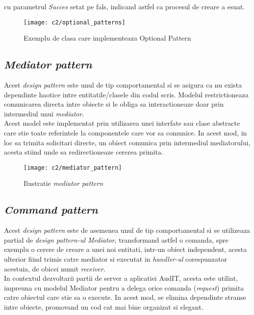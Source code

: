  cu parametrul \textit{Succes} setat pe fals, indicand astfel ca procesul de creare a esuat.\\

\begin{figure}[h]
	\centering
	
	\texttt{[image: c2/optional\_patterns]}
	\caption{Exemplu de clasa care implementeaza Optional Pattern}
\end{figure}

\subsection*{\textit{Mediator pattern}}
Acest \textit{design pattern} este unul de tip comportamental si se asigura ca nu exista dependinte haotice intre entitatile/clasele din codul scris. Modelul restrictioneaza comunicarea directa intre obiecte si le obliga sa interactioneaze doar prin intermediul unui \textit{mediator}.\\
Acest model este implementat prin utilizarea unei interfate sau clase abstracte care stie toate referintele la componentele care vor sa comunice. In acest mod, in loc sa trimita solicitari directe, un obiect comunica prin intermediul mediatorului, acesta stiind unde sa redirectioneaze cererea primita.


\begin{figure}[h]
	\centering
	
	\texttt{[image: c2/mediator\_pattern]}
	\caption{Ilustratie \textit{mediator pattern}}
\end{figure}

	\newpage
\subsection*{\textit{Command pattern}}	

Acest \textit{design pattern} este de asemenea unul de tip comportamental si se utilizeaza partial de \textit{design pattern-ul Mediator}, transformand astfel o comanda, spre exemplu o cerere de creare a unei noi entitati, intr-un obiect independent, acesta ulterior fiind trimis catre mediator si executat in \textit{handler-ul} corespunzator acestuia, de obicei numit \textit{receiver}.\\
In contextul dezvoltarii partii de server a aplicatiei AudIT, acesta este utiliat, impreuna cu modelul Mediator pentru a delega orice comanda (\textit{request}) primita catre obiectul care stie sa o execute. In acest mod, se elimina dependinte stranse intre obiecte, promovand un cod cat mai bine organizat si elegant.\\

